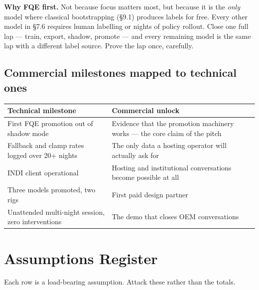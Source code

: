 \documentclass[11pt]{article}
\begin{document}
\begin{keybox}
\textbf{Why FQE first.} Not because focus matters most, but because it is the
\emph{only} model where classical bootstrapping (§9.1) produces labels for free.
Every other model in §7.6 requires human labelling or nights of policy rollout.
Close one full lap --- train, export, shadow, promote --- and every remaining
model is the same lap with a different label source. Prove the lap once,
carefully.
\end{keybox}

\subsection{Commercial milestones mapped to technical ones}

\begin{center}
\small
\begin{tabular}{@{}p{5.4cm}p{8.6cm}@{}}
\toprule
\textbf{Technical milestone} & \textbf{Commercial unlock} \\
\midrule
First FQE promotion out of shadow mode & Evidence that the promotion machinery works --- the core claim of the pitch \\
Fallback and clamp rates logged over 20+ nights & The only data a hosting operator will actually ask for \\
INDI client operational & Hosting and institutional conversations become possible at all \\
Three models promoted, two rigs & First paid design partner \\
Unattended multi-night session, zero interventions & The demo that closes OEM conversations \\
\bottomrule
\end{tabular}
\end{center}

\newpage
\appendix
\section{Assumptions Register}

Each row is a load-bearing assumption. Attack these rather than the totals.
\end{document}
